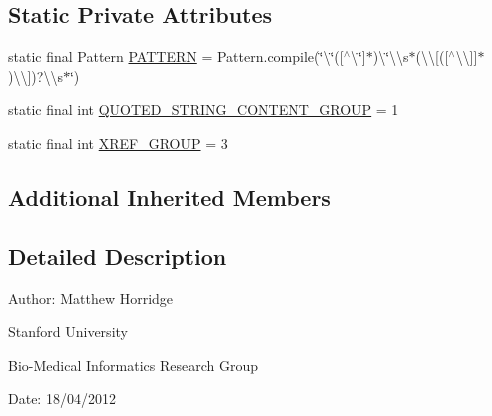 \subsection*{Static Private Attributes}
\begin{DoxyCompactItemize}
\item 
static final Pattern \hyperlink{classorg_1_1coode_1_1owlapi_1_1obo_1_1parser_1_1_def_tag_value_handler_aa360977d0275709b86f8c6b77af322e9}{P\-A\-T\-T\-E\-R\-N} = Pattern.\-compile(\char`\"{}\textbackslash{}\char`\"{}(\mbox{[}$^\wedge$\textbackslash{}\char`\"{}\mbox{]}$\ast$)\textbackslash{}\char`\"{}\textbackslash{}\textbackslash{}s$\ast$(\textbackslash{}\textbackslash{}\mbox{[}(\mbox{[}$^\wedge$\textbackslash{}\textbackslash{}\mbox{]}\mbox{]}$\ast$)\textbackslash{}\textbackslash{}\mbox{]})?\textbackslash{}\textbackslash{}s$\ast$\char`\"{})
\item 
static final int \hyperlink{classorg_1_1coode_1_1owlapi_1_1obo_1_1parser_1_1_def_tag_value_handler_ad2cc5718e64c10c3108e55ec24704a7c}{Q\-U\-O\-T\-E\-D\-\_\-\-S\-T\-R\-I\-N\-G\-\_\-\-C\-O\-N\-T\-E\-N\-T\-\_\-\-G\-R\-O\-U\-P} = 1
\item 
static final int \hyperlink{classorg_1_1coode_1_1owlapi_1_1obo_1_1parser_1_1_def_tag_value_handler_a486dda4237f394c99628e5a2b1efd7b1}{X\-R\-E\-F\-\_\-\-G\-R\-O\-U\-P} = 3
\end{DoxyCompactItemize}
\subsection*{Additional Inherited Members}


\subsection{Detailed Description}
Author\-: Matthew Horridge\par
 Stanford University\par
 Bio-\/\-Medical Informatics Research Group\par
 Date\-: 18/04/2012 

